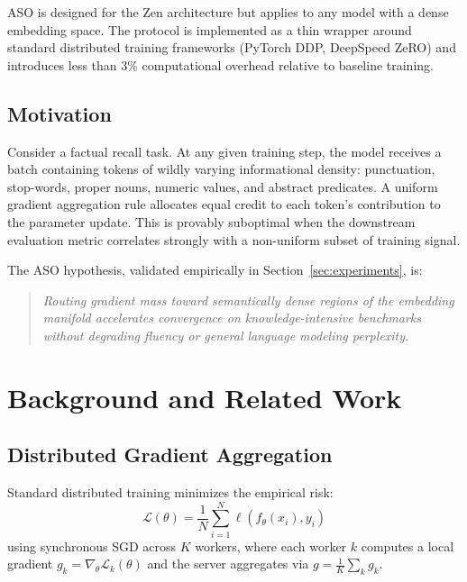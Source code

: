 \documentclass[11pt,a4paper]{article}
\begin{document}
ASO is designed for the Zen architecture \cite{zenlm2025mode} but applies to any
model with a dense embedding space. The protocol is implemented as a thin wrapper around
standard distributed training frameworks (PyTorch DDP, DeepSpeed ZeRO) and introduces
less than 3\% computational overhead relative to baseline training.

\subsection{Motivation}

Consider a factual recall task. At any given training step, the model receives a batch
containing tokens of wildly varying informational density: punctuation, stop-words,
proper nouns, numeric values, and abstract predicates. A uniform gradient aggregation
rule allocates equal credit to each token's contribution to the parameter update. This
is provably suboptimal when the downstream evaluation metric correlates strongly with
a non-uniform subset of training signal.

The ASO hypothesis, validated empirically in Section~\ref{sec:experiments}, is:

\begin{quote}
\emph{Routing gradient mass toward semantically dense regions of the embedding manifold
accelerates convergence on knowledge-intensive benchmarks without degrading fluency or
general language modeling perplexity.}
\end{quote}

\section{Background and Related Work}
\label{sec:background}

\subsection{Distributed Gradient Aggregation}

Standard distributed training minimizes the empirical risk:
\begin{equation}
    \mathcal{L}(\theta) = \frac{1}{N} \sum_{i=1}^{N} \ell(f_\theta(x_i), y_i)
    \label{eq:empirical_risk}
\end{equation}
using synchronous SGD across $K$ workers, where each worker $k$ computes a local gradient
$g_k = \nabla_\theta \mathcal{L}_k(\theta)$ and the server aggregates via
$g = \frac{1}{K}\sum_k g_k$.
\end{document}
